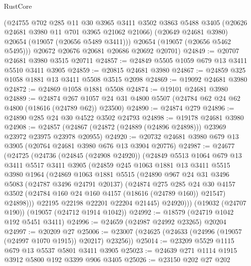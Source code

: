 \begin{lexlean}{RustCore}
\begin{coremodule}
        (@24755
          @702
          @285
          @11
          @30
          @3965
          @3411
          @3502
          @3863
          @5488
          @3405
          (@20626 @24681 @3980 @11 @701 @3965 @21062 @21066)
          (@20649 @24681 @3980)
          @20654
          (@19057 (@20656 @5489 @3411)))
        @20654
        (@19057 (@20656 @5462 @5495)))
      @20672
      @20676
      @20681
      @20686
      @20692
      @20701)
@24849 := @20707 @24681 @3980 @3515 @20711
@24857 := @24849 @5505 @1059 @679 @13 @3411 @5510 @3411 @3905
@24859 := @20815 @24681 @3980
@24867 := @24859 @325 @1058 @1881 @13 @3411 @5508 @3515 @2098
@24869 := @19092 @24681 @3980
@24872 := @24869 @1058 @1881 @5508
@24874 := @19101 @24681 @3980
@24889 := @24874
    @267
    @1057
    @24
    @31
    @4800
    @5507
    (@24784 @62 @24 @62 @4800 (@18616 (@24789 @62)) @23500)
@24890 := @24874 @279
@24896 := @24890 @285 @24 @30 @4522 @3502 @24793
@24898 := @19178 @24681 @3980
@24908 := @24857 (@24867 (@24872 (@24889 (@24896 @24898))) @23969 @23972 @23975 @23978 @20955)
@24920 := @20732 @24681 @3980 @679 @13 @3905 (@20764 @24681 @3980 @676 @13 @3904 @20776)
@24987 := @24677
    (@24725
      (@24736
        (@24845 (@24908 @24920))
        (@24849
          @5513
          @1064
          @679
          @13
          @3411
          @5517
          @3411
          @3905
          (@24859
            @245
            @1063
            @1881
            @13
            @3411
            @5515
            @3980
            @1964
            (@24869
              @1063
              @1881
              @5515
              (@24890
                @967
                @24
                @31
                @3496
                @5083
                (@24787 @3496 @24791 @20137)
                (@24874
                  @275
                  @285
                  @24
                  @30
                  @4157
                  @3502
                  (@24784 @160 @24 @160 @4157 (@18616 (@24789 @160)) @21547)
                  @24898)))
            @22195
            @22198
            @22201
            @22204
            @21445)
          @24920)))
    (@19032 (@24707 @190))
    (@19057 (@24712 @1914 @1042))
@24992 := @18579 (@24719 @1042 @192 @5451 @3411)
@24996 := @24659 (@24987 @24992 @23265) @20204
@24997 := @20209 @27
@25006 := @23007 (@24625 (@24633 (@24996 (@19057 (@24997 @1070 @1915)) @20217) @23256))
@25014 := @23209 @5529 @1115 @679 @13 @5537 @5801 @3411 @3905
@25023 := @24639 @271 @1114 @1915 @3912 @5800 @192 @3399 @906 @3405
@25026 := @23150 @202 @27 @202

\end{coremodule}
\end{lexlean}
